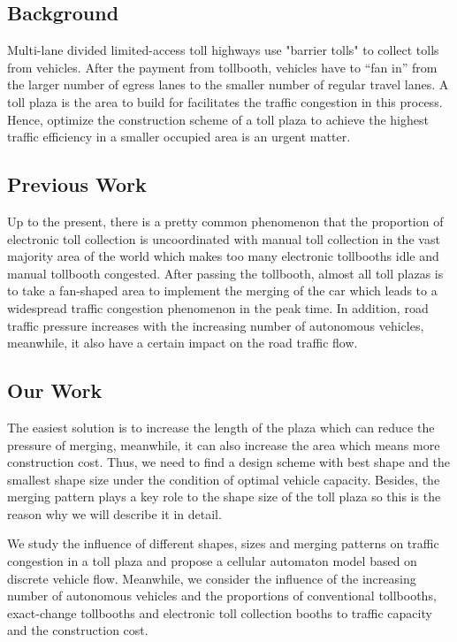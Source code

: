 \documentclass{mcmthesis}
\begin{document}
\subsection{Background}
	Multi-lane divided limited-access toll highways use "barrier tolls" to collect tolls from vehicles. After the payment from tollbooth, vehicles have to “fan in” from the larger number of egress lanes to the smaller number of regular travel lanes. A toll plaza is the area to build for facilitates the traffic congestion in this process. Hence, optimize the construction scheme of a toll plaza to achieve the highest traffic efficiency in a smaller occupied area is an urgent matter.

	
\subsection{Previous Work}
	Up to the present, there is a pretty common phenomenon that the proportion of electronic toll collection is uncoordinated with manual toll collection in the vast majority area of the world which makes too many electronic tollbooths idle and manual tollbooth congested. After passing the tollbooth, almost all toll plazas is to take a fan-shaped area to implement the merging of the car which leads to a widespread traffic congestion phenomenon in the peak time. In addition, road traffic pressure increases with the increasing number of autonomous vehicles, meanwhile, it also have a certain impact on the road traffic flow.
\subsection{Our Work}
	The easiest solution is to increase the length of the plaza which can reduce the pressure of merging, meanwhile, it can also increase the area which means more construction cost. Thus, we need to find a design scheme with best shape and the smallest shape size under the condition of optimal vehicle capacity. Besides, the merging pattern plays a key role to the shape size of the toll plaza so this is the reason why we will describe it in detail.
	
	We study the influence of different shapes, sizes and merging patterns on traffic congestion in a toll plaza and propose a cellular automaton model based on discrete vehicle flow. Meanwhile, we consider the influence of the increasing number of autonomous vehicles and the proportions of conventional tollbooths, exact-change tollbooths and electronic toll collection booths to traffic capacity and the construction cost.
\end{document}
